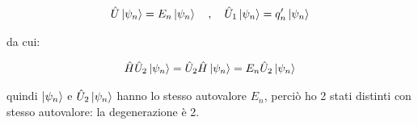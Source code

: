 \begin{align*}
	\hat{U}\ket{\psi_n} = E_n \ket{\psi_n} \quad ,  \quad \hat{U}_1\ket{\psi_n} = q_n' \ket{\psi_n}
\end{align*}

	da cui:
	
\begin{align*}
	\hat{H}\hat{U}_2 \ket{\psi_n} = \hat{U}_2 \hat{H} \ket{\psi_n} = E_n \hat{U}_2 \ket{\psi_n}
\end{align*}

	quindi $\ket{\psi_n}$ e $\hat{U}_2 \ket{\psi_n}$ hanno lo stesso autovalore $E_n$, perciò ho 2 stati distinti con stesso autovalore: la degenerazione è 2.

